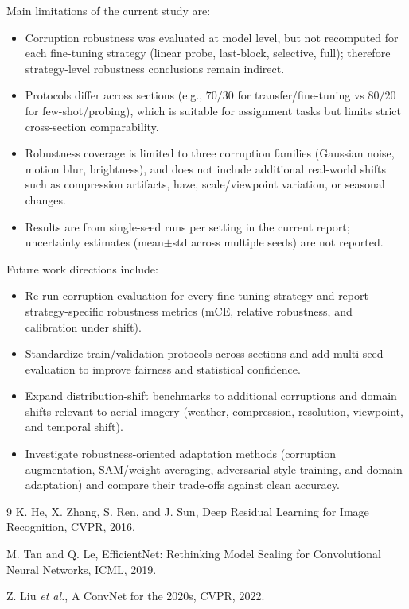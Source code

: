 \documentclass[11pt,a4paper]{article}
\begin{document}
Main limitations of the current study are:
\begin{itemize}
	\item Corruption robustness was evaluated at model level, but not recomputed for each fine-tuning strategy (linear probe, last-block, selective, full); therefore strategy-level robustness conclusions remain indirect.
	\item Protocols differ across sections (e.g., $70/30$ for transfer/fine-tuning vs $80/20$ for few-shot/probing), which is suitable for assignment tasks but limits strict cross-section comparability.
	\item Robustness coverage is limited to three corruption families (Gaussian noise, motion blur, brightness), and does not include additional real-world shifts such as compression artifacts, haze, scale/viewpoint variation, or seasonal changes.
	\item Results are from single-seed runs per setting in the current report; uncertainty estimates (mean$\pm$std across multiple seeds) are not reported.
\end{itemize}

Future work directions include:
\begin{itemize}
	\item Re-run corruption evaluation for every fine-tuning strategy and report strategy-specific robustness metrics (mCE, relative robustness, and calibration under shift).
	\item Standardize train/validation protocols across sections and add multi-seed evaluation to improve fairness and statistical confidence.
	\item Expand distribution-shift benchmarks to additional corruptions and domain shifts relevant to aerial imagery (weather, compression, resolution, viewpoint, and temporal shift).
	\item Investigate robustness-oriented adaptation methods (corruption augmentation, SAM/weight averaging, adversarial-style training, and domain adaptation) and compare their trade-offs against clean accuracy.
\end{itemize}

\begin{thebibliography}{9}
K. He, X. Zhang, S. Ren, and J. Sun, Deep Residual Learning for Image Recognition, CVPR, 2016.

M. Tan and Q. Le, EfficientNet: Rethinking Model Scaling for Convolutional Neural Networks, ICML, 2019.

Z. Liu \textit{et al.}, A ConvNet for the 2020s, CVPR, 2022.
\end{thebibliography}
\end{document}
